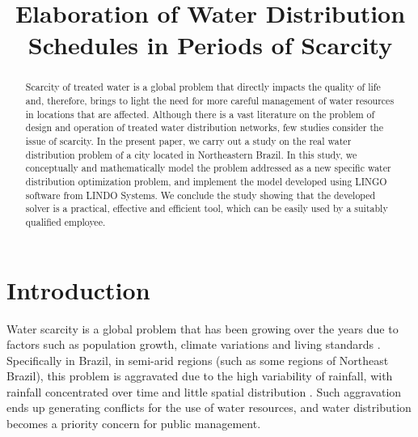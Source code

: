 \documentclass{singlecol}
\theoremstyle{TH}{
\newtheorem{lemma}{Lemma}
\newtheorem{theorem}[lemma]{Theorem}
\newtheorem{corrolary}[lemma]{Corrolary}
\newtheorem{conjecture}[lemma]{Conjecture}
\newtheorem{proposition}[lemma]{Proposition}
\newtheorem{claim}[lemma]{Claim}
\newtheorem{stheorem}[lemma]{Wrong Theorem}
\newtheorem{algorithm}{Algorithm}
}
\theoremstyle{THrm}{
\newtheorem{definition}{Definition}[section]
\newtheorem{question}{Question}[section]
\newtheorem{remark}{Remark}
\newtheorem{scheme}{Scheme}
}
\theoremstyle{THhit}{
\newtheorem{case}{Case}[section]
}
\begin{document}
%


\newpage

\setcounter{page}{1}






\BottomCatch

\CLline

\subtitle{}

\title{Elaboration of Water Distribution Schedules in Periods of Scarcity}

\begin{abstract}

Scarcity of treated water is a global problem that directly impacts the quality of life and, therefore, brings to light the need for more careful management of water resources in locations that are affected. Although there is a vast literature on the problem of design and operation of treated water distribution networks, few studies consider the issue of scarcity. In the present paper, we carry out a study on the real water distribution problem of a city located in Northeastern Brazil. In this study, we conceptually and mathematically model the problem addressed as a new specific water distribution optimization problem, and implement the model developed using LINGO software from LINDO Systems. We conclude the study showing that the developed solver is a practical, effective and efficient tool, which can be easily used by a suitably qualified employee.
\end{abstract}


\maketitle


 \section{Introduction}

	Water scarcity is a global problem that has been growing over the years due to factors such as population growth, climate variations and living standards \citep{HangEtAl2021}. Specifically in Brazil, in semi-arid regions (such as some regions of Northeast Brazil), this problem is aggravated due to the high variability of rainfall, with rainfall concentrated over time and little spatial distribution \citep{SilvaEtAl2019}. Such aggravation ends up generating conflicts for the use of water resources, and water distribution becomes a priority concern for public management.
\end{document}
